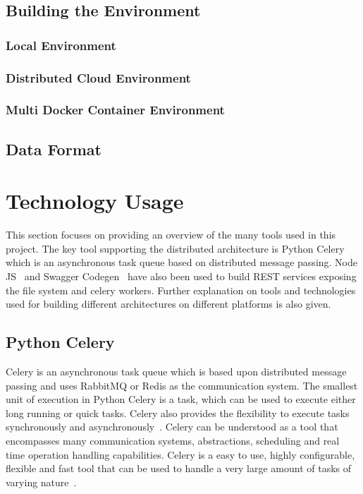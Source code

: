 \subsection{Building the Environment}

\subsubsection{Local Environment}

\subsubsection{Distributed Cloud Environment}

\subsubsection{Multi Docker Container Environment}

\subsection{Data Format}

\section{Technology Usage}

This section focuses on providing an overview of the many tools used in this 
project. The key tool supporting the distributed architecture is Python 
Celery~\cite{hid-sp18-416-www-python-celery} which is an asynchronous task 
queue based on distributed message passing. Node 
JS~\cite{hid-sp18-416-www-nodejs} and Swagger 
Codegen~\cite{hid-sp18-416-www-swagger-codegen} have also been used to build 
REST services exposing the file system and celery workers. Further explanation 
on tools and technologies used for building different architectures on 
different platforms is also given.

\subsection{Python Celery}

Celery is an asynchronous task queue which is based upon distributed message 
passing and uses RabbitMQ or Redis as the communication system. The smallest 
unit of execution in Python Celery is a task, which can be used to execute 
either long running or quick tasks. Celery also provides the flexibility to 
execute tasks synchronously and 
asynchronously~\cite{hid-sp18-416-www-python-celery}. Celery 
can be understood as a tool that encompasses many communication systems, 
abstractions, scheduling and real time operation handling capabilities. Celery 
is a easy to use, highly configurable, flexible and fast tool that can be used 
to handle a very large amount of tasks of varying 
nature~\cite{hid-sp18-416-www-vinta-celery-blog}.

